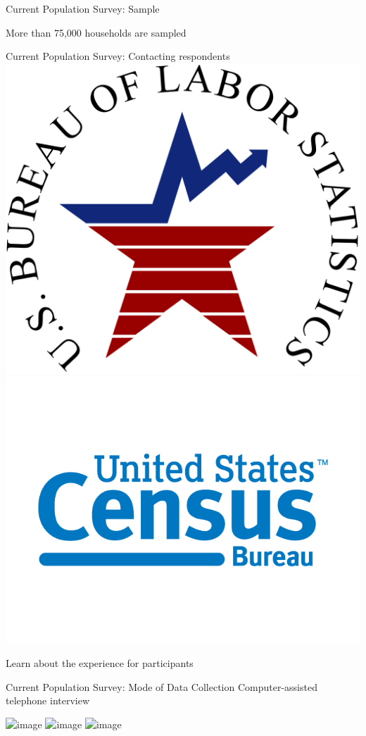 \documentclass{beamer}
\newcommand\bref[2]{\href{#1}{\color{blue}{#2}}}
\begin{document}
\begin{frame}{Current Population Survey: Sample}

More than 75,000 households are sampled

\end{frame}

\begin{frame}{Current Population Survey: Contacting respondents}
\includegraphics[width = .2\textwidth]{bls}\includegraphics[width = .3\textwidth]{census-logo}
 \pause

Learn about the experience for participants \bref{https://www.bls.gov/respondents/cps/home.htm}{here}
\end{frame}

\begin{frame}{Current Population Survey: Mode of Data Collection}
Computer-assisted telephone interview
\begin{center}
\includegraphics<1>[width = .8\textwidth]{cps_questionnaire_1}
\includegraphics<2>[width = .8\textwidth]{cps_questionnaire_2}
\includegraphics<3>[width = .8\textwidth]{cps_questionnaire_3}
\end{center}
\bref{https://www.census.gov/programs-surveys/cps/technical-documentation/questionnaires.html}{census.gov/programs-surveys/cps/technical-documentation/questionnaires.html}
\end{frame}
\end{document}
